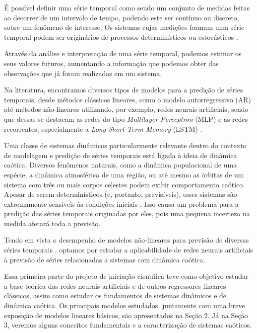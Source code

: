 \documentclass[a4paper, 12pt]{article}
\begin{document}
É possível definir uma série temporal como sendo um conjunto de medidas feitas ao decorrer de um intervalo de tempo, podendo este ser contínuo ou discreto, sobre um fenômeno de interesse. Os sistemas cujas medições formam uma série temporal podem ser originários de processos determinísticos ou estocásticos \cite{box2015time}.

Através da análise e interpretação de uma série temporal, podemos estimar os seus valores futuros, aumentando a informação que podemos obter das observações que já foram realizadas em um sistema.

Na literatura, encontramos diversos tipos de modelos para a  predição de séries temporais, desde métodos clássicos lineares, como o modelo autorregressivo (AR) \cite{box2015time} até métodos não-lineares utilizando, por exemplo, redes neurais artificiais, sendo que dessas se destacam as redes do tipo \textit{Multilayer Perceptron} (MLP) e as redes recorrentes, especialmente a \textit{Long Short-Term Memory} (LSTM)  \cite{connor1994recurrent}.

Uma classe de sistemas dinâmicos particularmente relevante dentro do contexto de modelagem e predição de séries temporais está ligada à ideia de dinâmica caótica. Diversos fenômenos naturais, como a dinâmica populacional de uma espécie, a dinâmica atmosférica de uma região, ou até mesmo as órbitas de um sistema com três ou mais corpos celestes podem exibir comportamento caótico. Apesar de serem determinísticos (e, portanto, previsíveis), esses sistemas são extremamente sensíveis às condições iniciais \cite{fiedler1994caos}. Isso causa um problema para a predição das séries temporais originadas por eles, pois uma pequena incerteza na medida afetará toda a previsão. 

Tendo em vista o desempenho de modelos não-lineares para previsão de diversas séries temporais \cite{connor1994recurrent}, optamos por estudar a aplicabilidade de redes neurais artificiais à previsão de séries relacionadas a sistemas com dinâmica caótica. 

Essa primeira parte do projeto de iniciação científica teve como objetivo estudar a base teórica das redes neurais artificiais e de outros regressores lineares clássicos, assim como estudar os fundamentos de sistemas dinâmicos e de dinâmica caótica. Os principais modelos estudados, juntamente com uma breve exposição de modelos lineares básicos, são apresentados na Seção 2. Já na Seção 3, veremos alguns conceitos fundamentais e a caracterização de sistemas caóticos.
\end{document}
